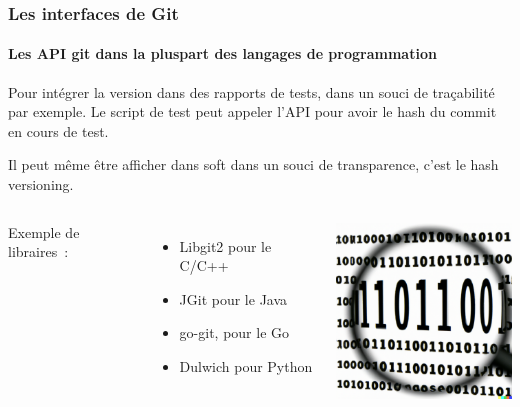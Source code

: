 \documentclass{beamer}
\begin{document}
    \begin{frame}
        \frametitle{Les interfaces de Git}
        \framesubtitle{Les API git dans la pluspart des langages de programmation}
        \transdissolve
        Pour intégrer la version dans des rapports de tests, dans un souci de traçabilité par exemple.
        Le script de test peut appeler l'API pour avoir le hash du commit en cours de test.

        Il peut même être afficher dans soft dans un souci de transparence, c'est le hash versioning.
        \bigbreak
        \begin{columns}
            Exemple de libraires~:
            \begin{itemize}
                \item Libgit2 pour le C/C++
                \item JGit pour le Java
                \item go-git, pour le Go
                \item Dulwich pour Python
            \end{itemize}
            \centering
            \includegraphics[width=5cm]{image/code-scrutiny.png}
        \end{columns}
    \end{frame}
\end{document}
